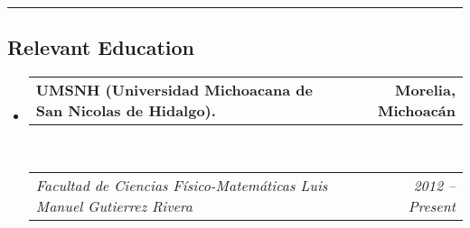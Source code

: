 \documentclass[10pt,letterpaper]{article}
\makeatletter
\newcommand{\headerrow}[2]
{\begin{tabular*}{\linewidth}{l@{\extracolsep{\fill}}r}
	#1 &
	#2 \\
\end{tabular*}}
\makeatother
\begin{document}
\hrule
\vspace{-0.4em}
\subsection*{Relevant Education}

\begin{itemize}
	\parskip=0.1em

	\item 
	\headerrow
		{\textbf{UMSNH (Universidad Michoacana de San Nicolas de Hidalgo).}}
		{\textbf{Morelia, Michoacán}}
	\\
	\headerrow
		{\emph{Facultad de Ciencias Físico-Matemáticas Luis Manuel Gutierrez Rivera}}
		{\emph{2012 -- Present}}

\end{itemize}
\end{document}
